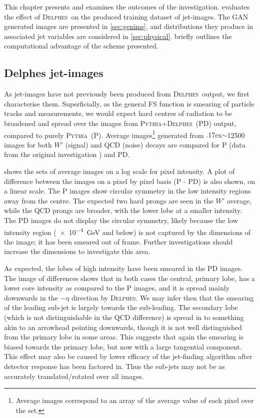 \documentclass[twocolumn]{article}
\newcommand{\pkg}[1]{\textsc{#1}}
\newcommand{\pythia}{\pkg{Pythia}}
\newcommand{\delphes}{\pkg{Delphes}}
\newcommand{\around}{{\raise.17ex\hbox{$\scriptstyle\sim$}}}
\begin{document}
This chapter presents and examines the outcomes of the investigation.  evaluates the effect of \delphes~on the produced training dataset of jet-images. The GAN generated images are presented in \cref{sec:genims}, and distributions they produce in associated jet variables are considered in \cref{sec:physical}.  briefly outlines the computational advantage of the scheme presented.

\subsection{Delphes jet-images}
\label{sec:delphes-ims}

As jet-images have not previously been produced from \delphes~output, we first characterise them. Superficially, as the general FS function is smearing of particle tracks and measurements, we would expect hard centres of radiation to be broadened and spread over the images from \pythia+\delphes~(PD) output, compared to purely \pythia~(P). Average images\footnote{Average images correspond to an array of the average value of each pixel over the set.} generated from \around\num{12500} images for both $W'$ (signal) and QCD (noise) decays are compared for P (data from the original investigation \cite{de2017learning}) and PD. 

 shows the sets of average images on a log scale for pixel intensity. A plot of difference between the images on a pixel by pixel basis (P - PD) is also shown, on a linear scale. The P images show circular symmetry in the low intensity regions away from the centre. The expected two hard prongs are seen in the $W'$ average, while the QCD prongs are broader, with the lower lobe at a smaller intensity. The PD images do not display the circular symmetry, likely because the low intensity region (\SI{e-4}{\giga\electronvolt} and below) is not captured by the dimensions of the image; it has been smeared out of frame. Further investigations should increase the dimensions to investigate this area.

As expected, the lobes of high intensity have been smeared in the PD images. The image of differences shows that in both cases the central, primary lobe, has a lower core intensity as compared to the P images, and it is spread mainly downwards in the $-\eta$ direction by \delphes. We may infer then that the smearing of the leading sub-jet is largely towards the sub-leading. The secondary lobe (which is not distinguishable in the QCD difference) is spread in to something akin to an arrowhead pointing downwards, though it is not well distinguished from the primary lobe in some areas. This suggests that again the smearing is biased towards the primary lobe, but now with a large tangential component. This effect may also be caused by lower efficacy of the jet-finding algorithm after detector response has been factored in. Thus the sub-jets may not be as accurately translated/rotated over all images.
\end{document}
